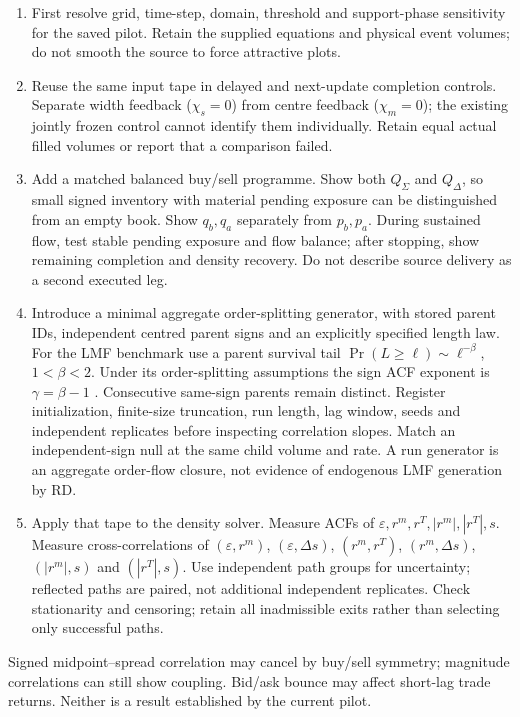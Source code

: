 \documentclass[11pt,a4paper]{article}
\begin{document}
\begin{enumerate}
\item First resolve grid, time-step, domain, threshold and support-phase
sensitivity for the saved pilot. Retain the supplied equations and physical
event volumes; do not smooth the source to force attractive plots.
\item Reuse the same input tape in delayed and next-update completion controls.
Separate width feedback ($\chi_s=0$) from centre feedback ($\chi_m=0$);
the existing jointly frozen control cannot identify them individually.
Retain equal actual filled volumes or report that a comparison failed.
\item Add a matched balanced buy/sell programme. Show both $Q_\Sigma$ and
$Q_\Delta$, so small signed inventory with material pending exposure can be
distinguished from an empty book. Show $q_b,q_a$ separately from $p_b,p_a$.
During sustained flow, test stable pending exposure and flow balance; after
stopping, show remaining completion and density recovery. Do not describe
source delivery as a second executed leg.
\item Introduce a minimal aggregate order-splitting generator, with stored
parent IDs, independent centred parent signs and an explicitly specified
length law. For the LMF benchmark use a parent survival tail
$\Pr(L\geq\ell)\sim\ell^{-\beta}$, $1<\beta<2$. Under its order-splitting
assumptions the sign ACF exponent is $\gamma=\beta-1$ \cite{lmf}.
Consecutive same-sign parents remain distinct. Register initialization,
finite-size truncation, run length, lag window, seeds and independent
replicates before inspecting correlation slopes. Match an independent-sign
null at the same child volume and rate. A run generator is an aggregate
order-flow closure, not evidence of endogenous LMF generation by RD.
\item Apply that tape to the density solver. Measure ACFs of
$\varepsilon,r^m,r^T,|r^m|,|r^T|,s$. Measure cross-correlations of
$(\varepsilon,r^m)$, $(\varepsilon,\Delta s)$, $(r^m,r^T)$,
$(r^m,\Delta s)$, $(|r^m|,s)$ and $(|r^T|,s)$.
Use independent path groups for uncertainty; reflected paths are paired,
not additional independent replicates. Check stationarity and censoring;
retain all inadmissible exits rather than selecting only successful paths.
\end{enumerate}
Signed midpoint--spread correlation may cancel by buy/sell symmetry;
magnitude correlations can still show coupling. Bid/ask bounce may affect
short-lag trade returns. Neither is a result established by the current pilot.
\end{document}
